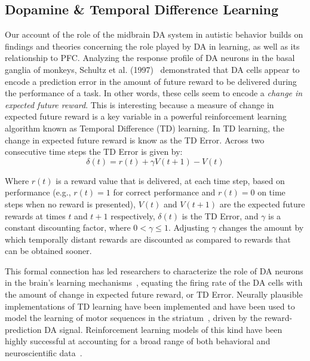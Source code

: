 \subsection{Dopamine \& Temporal Difference Learning}
Our account of the role of the midbrain DA system in autistic behavior builds on findings and theories concerning the role played by DA in learning, as well as its relationship to PFC. Analyzing the response profile of DA neurons in the basal ganglia of monkeys, Schultz et al. (1997)~\nocite{schultz97td} demonstrated that DA cells appear to encode a prediction error in the amount of future reward to be delivered during the performance of a task. In other words, these cells seem to encode a \emph{change in expected future reward}. This is interesting because a measure of change in expected future reward is a key variable in a powerful reinforcement learning algorithm known as Temporal Difference (TD) learning. In TD learning, the change in expected future reward is know as the TD Error. Across two consecutive time steps the TD Error is given by: 
\begin{equation}\delta(t) = r(t) + \gamma V(t+1) - V(t)\end{equation}

Where $r(t)$ is a reward value that is delivered, at each time step, based on performance (e.g., $r(t) = 1$ for correct performance and $r(t)=0$ on time steps when no reward is presented), $V(t)$ and $V(t+1)$ are the expected future rewards at times $t$ and $t+1$ respectively, \begin{math}\delta(t)\end{math} is the TD Error, and \begin{math}\gamma\end{math} is a constant discounting factor, where \begin{math}0 < \gamma \leq 1\end{math}. Adjusting \begin{math}\gamma\end{math} changes the amount by which temporally distant rewards are discounted as compared to rewards that can be obtained sooner.

This formal connection has led researchers to characterize the role of DA neurons in the brain's learning mechanisms~\cite{BartoAG:1994:TDLearning,MontaguePR:1996:Dopamine}, equating the firing rate of the DA cells with the amount of change in expected future reward, or TD Error. Neurally plausible implementations of TD learning have been implemented and have been used to model the learning of motor sequences in the striatum~\cite{MontaguePR:1996:Dopamine}, driven by the reward-prediction DA signal. Reinforcement learning models of this kind have been highly successful at accounting for a broad range of both behavioral and neuroscientific data~\cite{DayanP:2008:Ugly}.


